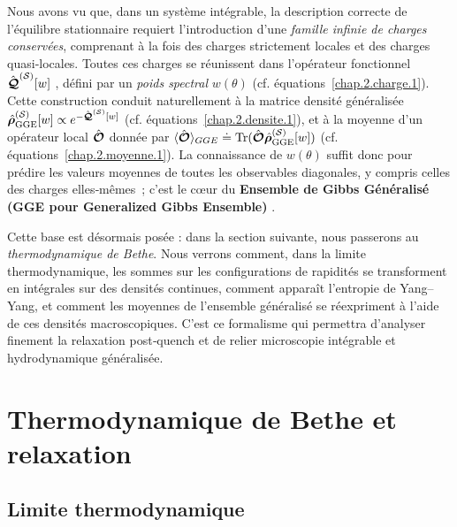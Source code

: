 Nous avons vu que, dans un système intégrable, la description correcte de l’équilibre stationnaire requiert l’introduction d’une \emph{famille infinie de charges conservées}, comprenant à la fois des charges strictement locales et des charges quasi‑locales.
Toutes ces charges se réunissent dans l’opérateur fonctionnel
\(
\hat{\bm{\mathcal{Q}}}^{(\mathcal{S})}[w]
\)
, défini par un \emph{poids spectral}  $w(\theta)$ (cf. équations~\eqref{chap.2.charge.1}).
Cette construction conduit naturellement à la matrice densité généralisée
\(
\hat{\bm{\rho}}^{(\mathcal{S})}_{\mathrm{GGE}}[w]  \propto  e^{-\hat{\bm{\mathcal{Q}}}^{(\mathcal{S})}[w]}
\) 
(cf. équations~\eqref{chap.2.densite.1}), et à la moyenne d’un opérateur local $\hat{\bm{\mathcal{O}}}$ donnée par
\(
\langle \hat{\bm{\mathcal{O}}}\rangle_{GGE}  \doteq  \displaystyle  \text{Tr} (\hat{\bm{\mathcal{O}}}\hat{\bm{\rho}}^{(\mathcal{S})}_{\mathrm{GGE}}[w])
\)
(cf. équations~\eqref{chap.2.moyenne.1}).
La connaissance de $w(\theta)$ suffit donc pour prédire les valeurs moyennes de toutes les observables diagonales, y compris celles des charges elles‑mêmes ; c’est le cœur du {\bf Ensemble de Gibbs Généralisé (GGE pour Generalized Gibbs Ensemble)} .

\medskip
Cette base est désormais posée : dans la section suivante, nous passerons au \emph{thermodynamique de Bethe}.
Nous verrons comment, dans la limite thermodynamique, les sommes sur les configurations de rapidités se transforment en intégrales sur des densités continues, comment apparaît l’entropie de Yang–Yang, et comment les moyennes de l’ensemble généralisé se réexpriment à l’aide de ces densités macroscopiques.
C’est ce formalisme qui permettra d’analyser finement la relaxation post‑quench et de relier microscopie intégrable et hydrodynamique généralisée.



%

\section{Thermodynamique de Bethe et relaxation}

\subsection{Limite thermodynamique}

